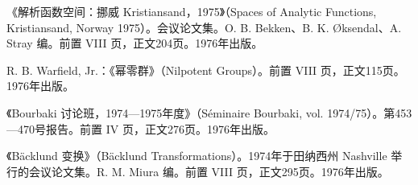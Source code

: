 \begin{description}[style=nextline,leftmargin=1.5em,itemsep=7pt]
\item[第512卷]《解析函数空间：挪威 Kristiansand，1975》（Spaces of Analytic Functions, Kristiansand, Norway 1975）。会议论文集。O. B. Bekken、B. K. Øksendal、A. Stray 编。前置 VIII 页，正文204页。1976年出版。
\item[第513卷] R. B. Warfield, Jr.：《幂零群》（Nilpotent Groups）。前置 VIII 页，正文115页。1976年出版。
\item[第514卷]《Bourbaki 讨论班，1974—1975年度》（Séminaire Bourbaki, vol. 1974/75）。第453—470号报告。前置 IV 页，正文276页。1976年出版。
\item[第515卷]《Bäcklund 变换》（Bäcklund Transformations）。1974年于田纳西州 Nashville 举行的会议论文集。R. M. Miura 编。前置 VIII 页，正文295页。1976年出版。
\end{description}
\endgroup

